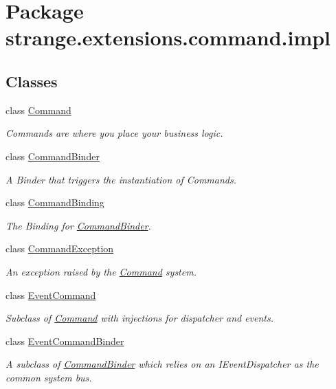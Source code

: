 \hypertarget{namespacestrange_1_1extensions_1_1command_1_1impl}{\section{Package strange.\-extensions.\-command.\-impl}
\label{namespacestrange_1_1extensions_1_1command_1_1impl}
}
\subsection*{Classes}
\begin{DoxyCompactItemize}
\item 
class \hyperlink{classstrange_1_1extensions_1_1command_1_1impl_1_1_command}{Command}
\begin{DoxyCompactList}\small\item\em Commands are where you place your business logic. \end{DoxyCompactList}\item 
class \hyperlink{classstrange_1_1extensions_1_1command_1_1impl_1_1_command_binder}{Command\-Binder}
\begin{DoxyCompactList}\small\item\em A Binder that triggers the instantiation of Commands. \end{DoxyCompactList}\item 
class \hyperlink{classstrange_1_1extensions_1_1command_1_1impl_1_1_command_binding}{Command\-Binding}
\begin{DoxyCompactList}\small\item\em The Binding for \hyperlink{classstrange_1_1extensions_1_1command_1_1impl_1_1_command_binder}{Command\-Binder}. \end{DoxyCompactList}\item 
class \hyperlink{classstrange_1_1extensions_1_1command_1_1impl_1_1_command_exception}{Command\-Exception}
\begin{DoxyCompactList}\small\item\em An exception raised by the \hyperlink{classstrange_1_1extensions_1_1command_1_1impl_1_1_command}{Command} system. \end{DoxyCompactList}\item 
class \hyperlink{classstrange_1_1extensions_1_1command_1_1impl_1_1_event_command}{Event\-Command}
\begin{DoxyCompactList}\small\item\em Subclass of \hyperlink{classstrange_1_1extensions_1_1command_1_1impl_1_1_command}{Command} with injections for dispatcher and events. \end{DoxyCompactList}\item 
class \hyperlink{classstrange_1_1extensions_1_1command_1_1impl_1_1_event_command_binder}{Event\-Command\-Binder}
\begin{DoxyCompactList}\small\item\em A subclass of \hyperlink{classstrange_1_1extensions_1_1command_1_1impl_1_1_command_binder}{Command\-Binder} which relies on an I\-Event\-Dispatcher as the common system bus. \end{DoxyCompactList}\end{DoxyCompactItemize}
